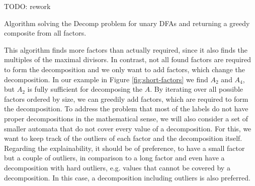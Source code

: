 TODO: rework

\begin{algorithm}[H]
	\label{algo:composite}
	\DontPrintSemicolon
	
	
	
	
	\caption{Algorithm solving the Decomp problem for unary DFAs and returning a greedy composite from all factors.}
\end{algorithm}

This algorithm finds more factors than actually required, since it also finds the multiples of the maximal divisors.
In contrast, not all found factors are required to form the decomposition and we only want to add factors, which change the decomposition.
In our example in Figure \ref{fig:short-factors} we find $A_2$ and $A_4$, but $A_2$ is fully sufficient for decomposing the \DFA $A$.
By iterating over all possible factors ordered by size, we can greedily add factors, which are required to form the decomposition.
To address the problem that most of the labels do not have proper decompositions in the mathematical sense, we will also consider a set of smaller automata that do not cover every value of a decomposition.
For this, we want to keep track of the outliers of each factor and the decomposition itself.
Regarding the explainability, it should be of preference, to have a small factor but a couple of outliers, in comparison to a long factor and even have a decomposition with hard outliers, e.g. values that cannot be covered by a decomposition.
In this case, a decomposition including outliers is also preferred.

